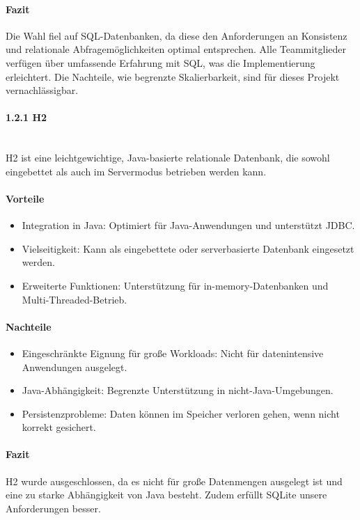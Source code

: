 \documentclass[a4paper,12pt]{report}
\begin{document}
    \paragraph*{Fazit}
    Die Wahl fiel auf SQL-Datenbanken, da diese den Anforderungen an Konsistenz und relationale Abfragemöglichkeiten optimal entsprechen.
    Alle Teammitglieder verfügen über umfassende Erfahrung mit SQL, was die Implementierung erleichtert.
    Die Nachteile, wie begrenzte Skalierbarkeit, sind für dieses Projekt vernachlässigbar.

    \paragraph*{1.2.1 H2}\mbox{}\\
    H2 ist eine leichtgewichtige, Java-basierte relationale Datenbank, die sowohl eingebettet als auch im Servermodus betrieben werden kann.

    \paragraph*{Vorteile}
    \begin{itemize}
        \item Integration in Java: Optimiert für Java-Anwendungen und unterstützt JDBC.
        \item Vielseitigkeit: Kann als eingebettete oder serverbasierte Datenbank eingesetzt werden.
        \item Erweiterte Funktionen: Unterstützung für in-memory-Datenbanken und Multi-Threaded-Betrieb.
    \end{itemize}

    \paragraph*{Nachteile}
    \begin{itemize}
        \item Eingeschränkte Eignung für große Workloads: Nicht für datenintensive Anwendungen ausgelegt.
        \item Java-Abhängigkeit: Begrenzte Unterstützung in nicht-Java-Umgebungen.
        \item Persistenzprobleme: Daten können im Speicher verloren gehen, wenn nicht korrekt gesichert.
    \end{itemize}

    \paragraph*{Fazit}
    H2 wurde ausgeschlossen, da es nicht für große Datenmengen ausgelegt ist und eine zu starke Abhängigkeit von Java besteht.
    Zudem erfüllt SQLite unsere Anforderungen besser.
\end{document}
